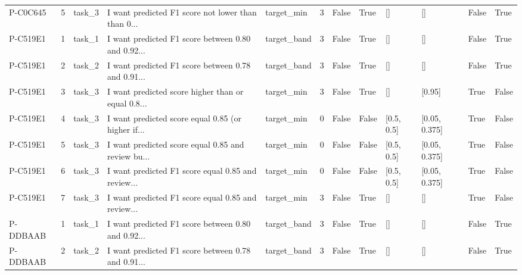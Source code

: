 \begin{tabular}{lrlllrllllll}
   P-C0C645 &        5 & task\_3 & I want predicted F1 score not lower than than 0... &    target\_min &          3 &          False &                  True &               [] &             [] &              False &             True \\
   P-C519E1 &        1 & task\_1 & I want predicted F1 score between 0.80 and 0.92... &   target\_band &          3 &          False &                  True &               [] &             [] &              False &             True \\
   P-C519E1 &        2 & task\_2 & I want predicted F1 score between 0.78 and 0.91... &   target\_band &          3 &          False &                  True &               [] &             [] &              False &             True \\
   P-C519E1 &        3 & task\_3 & I want predicted score higher than or equal 0.8... &    target\_min &          3 &          False &                  True &               [] &         [0.95] &               True &            False \\
   P-C519E1 &        4 & task\_3 & I want predicted score equal 0.85 (or higher if... &    target\_min &          0 &          False &                 False &       [0.5, 0.5] &  [0.05, 0.375] &               True &            False \\
   P-C519E1 &        5 & task\_3 & I want predicted score equal 0.85 and review bu... &    target\_min &          0 &          False &                 False &       [0.5, 0.5] &  [0.05, 0.375] &               True &            False \\
   P-C519E1 &        6 & task\_3 & I want predicted F1 score equal 0.85 and review... &    target\_min &          0 &          False &                 False &       [0.5, 0.5] &  [0.05, 0.375] &               True &            False \\
   P-C519E1 &        7 & task\_3 & I want predicted F1 score equal 0.85 and review... &    target\_min &          3 &          False &                  True &               [] &             [] &               True &            False \\
   P-DDBAAB &        1 & task\_1 & I want predicted F1 score between 0.80 and 0.92... &   target\_band &          3 &          False &                  True &               [] &             [] &              False &             True \\
   P-DDBAAB &        2 & task\_2 & I want predicted F1 score between 0.78 and 0.91... &   target\_band &          3 &          False &                  True &               [] &             [] &              False &             True \\

\end{tabular}
